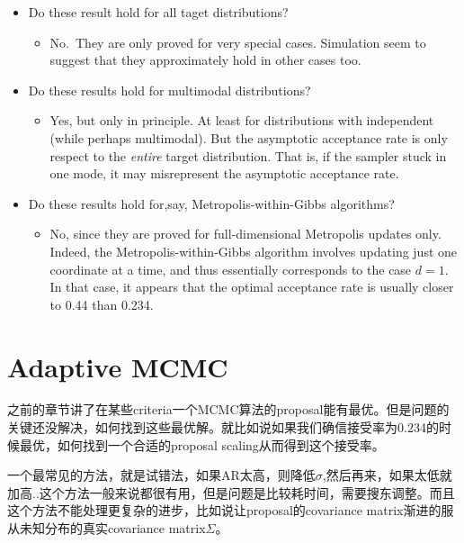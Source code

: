 \documentclass[
]{book}
\providecommand{\tightlist}{%
  \setlength{\itemsep}{0pt}\setlength{\parskip}{0pt}}
\theoremstyle{definition}
\theoremstyle{definition}
\theoremstyle{definition}
\theoremstyle{remark}
\begin{document}
\begin{itemize}
\tightlist
\item
  Do these result hold for all taget distributions?

  \begin{itemize}
  \tightlist
  \item
    No.~They are only proved for very special cases. Simulation seem to suggest that they approximately hold in other cases too.
  \end{itemize}
\item
  Do these results hold for multimodal distributions?

  \begin{itemize}
  \tightlist
  \item
    Yes, but only in principle. At least for distributions with independent (while perhaps multimodal). But the asymptotic acceptance rate is only respect to the \emph{entire} target distribution. That is, if the sampler stuck in one mode, it may misrepresent the asymptotic acceptance rate.
  \end{itemize}
\item
  Do these results hold for,say, Metropolis-within-Gibbs algorithms?

  \begin{itemize}
  \tightlist
  \item
    No, since they are proved for full-dimensional Metropolis updates only. Indeed, the Metropolis-within-Gibbs algorithm involves updating just one coordinate at a time, and thus essentially corresponds to the case \(d=1\). In that case, it appears that the optimal acceptance rate is usually closer to 0.44 than 0.234.
  \end{itemize}
\end{itemize}

\hypertarget{adaptive-mcmc-1}{%
\section{Adaptive MCMC}\label{adaptive-mcmc-1}}

之前的章节讲了在某些criteria一个MCMC算法的proposal能有最优。但是问题的关键还没解决，如何找到这些最优解。就比如说如果我们确信接受率为0.234的时候最优，如何找到一个合适的proposal scaling从而得到这个接受率。

一个最常见的方法，就是试错法，如果AR太高，则降低\(\sigma\),然后再来，如果太低就加高..这个方法一般来说都很有用，但是问题是比较耗时间，需要搜东调整。而且这个方法不能处理更复杂的进步，比如说让proposal的covariance matrix渐进的服从未知分布的真实covariance matrix\(\Sigma\)。
\end{document}
